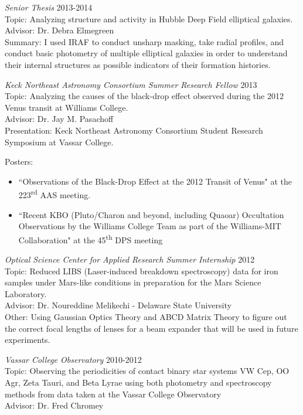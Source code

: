 \documentclass[line,margin]{res}
\begin{document}
\begin{resume}
				
{\sl Senior Thesis} \hfill 2013-2014 \\
				Topic: Analyzing structure and activity in Hubble Deep Field elliptical
galaxies. \\
Advisor: Dr. Debra Elmegreen\\
Summary: I used IRAF to conduct unsharp masking, take radial profiles, and conduct basic photometry of multiple elliptical galaxies in order to understand their internal structures as possible indicators of their formation histories.
				
{\sl Keck Northeast Astronomy Consortium Summer Research Fellow} \hfill 2013 \\
				Topic: Analyzing the causes of the black-drop effect observed during the 2012 Venus transit at Williams College.\\
				Advisor: Dr. Jay M. Pasachoff\\
Presentation: Keck Northeast Astronomy Consortium Student Research Symposium at Vassar College.

Posters:
\begin{itemize}
\item ``Observations of the Black-Drop Effect at the 2012 Transit of Venus" at the 223\textsuperscript{rd} AAS meeting.
\item ``Recent KBO (Pluto/Charon and beyond, including Quaoar) Occultation Observations by the Williams College Team as part of the Williams-MIT Collaboration" at the 45\textsuperscript{th} DPS meeting
\end{itemize}

				
{\sl Optical Science Center for Applied Research Summer Internship} \hfill 2012 \\
                Topic: Reduced LIBS (Laser-induced breakdown spectroscopy) data for iron samples under Mars-like conditions in preparation for the Mars Science Laboratory.\\  
                Advisor: Dr. Noureddine Melikechi - Delaware State University\\
Other: Using Gaussian Optics Theory and ABCD Matrix Theory to figure out the correct focal lengths of lenses for a beam expander that will be used in future experiments.
                 
{\sl Vassar College Observatory} \hfill 2010-2012 \\
               Topic: Observing the periodicities of contact binary star systems VW Cep, OO Agr, Zeta Tauri, and Beta Lyrae using both photometry and spectroscopy methods from data taken at the Vassar College Observatory\\
                Advisor: Dr. Fred Chromey
                

\end{resume}
\end{document}
